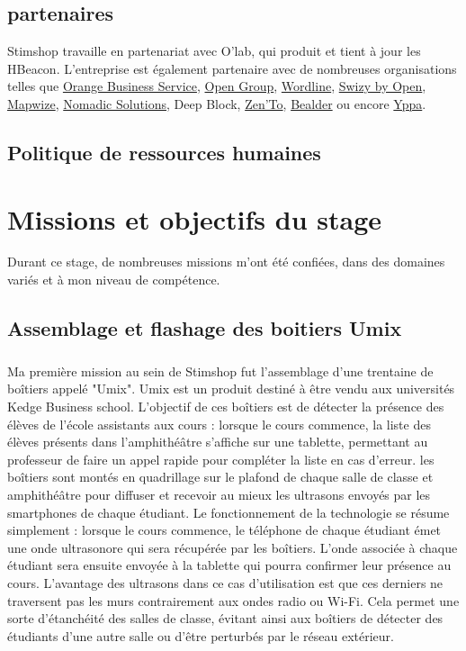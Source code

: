 \documentclass[12pt]{report}
\begin{document}
	\section{partenaires}
		
Stimshop travaille en partenariat avec O'lab, qui produit et tient à jour les HBeacon. L'entreprise est également partenaire avec de nombreuses organisations telles que \href{https://www.orange-business.com/fr}{Orange Business Service}, \href{https://www.open.global/}{Open Group}, \href{https://worldline.com/content/worldline/en/home.html}{Wordline}, \href{https://swizi.open.global/}{Swizy by Open}, \href{https://www.mapwize.io/en/}{Mapwize}, \href{http://www.nomadicsolutions.biz/en/}{Nomadic Solutions}, Deep Block, \href{http://www.zento.fr/}{Zen'To}, \href{https://bealder.com/}{Bealder} ou encore \href{http://yppa.fans/}{Yppa}. 

	\section{Politique de ressources humaines}



\chapter{Missions et objectifs du stage}
		
Durant ce stage, de nombreuses missions m'ont été confiées, dans des domaines variés et à mon niveau de compétence. 

	\section{Assemblage et flashage des boitiers Umix}
		
\paragraph{}
Ma première mission au sein de Stimshop fut l'assemblage d'une trentaine de boîtiers appelé "Umix". Umix est un produit destiné à être vendu aux universités Kedge Business school. L'objectif de ces boîtiers est de détecter la présence des élèves de l'école assistants aux cours : lorsque le cours commence, la liste des élèves présents dans l'amphithéâtre s'affiche sur une tablette, permettant au professeur de faire un appel rapide pour compléter la liste en cas d'erreur. les boîtiers sont montés en quadrillage sur le plafond de chaque salle de classe et amphithéâtre pour diffuser et recevoir au mieux les ultrasons envoyés par les smartphones de chaque étudiant. Le fonctionnement de la technologie se résume simplement : lorsque le cours commence, le téléphone de chaque étudiant émet une onde ultrasonore qui sera récupérée par les boîtiers. L'onde associée à chaque étudiant sera ensuite envoyée à la tablette qui pourra confirmer leur présence au cours. L'avantage des ultrasons dans ce cas d'utilisation est que ces derniers ne traversent pas les murs contrairement aux ondes radio ou Wi-Fi. Cela permet une sorte d'étanchéité des salles de classe, évitant ainsi aux boîtiers de détecter des étudiants d'une autre salle ou d'être perturbés par le réseau extérieur.  
\end{document}
